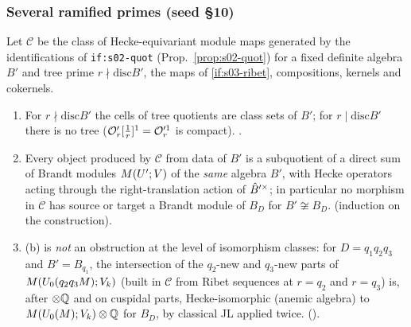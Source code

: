 \subsubsection{Several ramified primes (seed \S10)}\label{sss:s05-general}
\begin{proposition}\label{prop:s05-nochain}
Let $\mathcal C$ be the class of Hecke-equivariant module maps generated by the identifications of \texttt{if:s02-quot}
(Prop.~\ref{prop:s02-quot}) for a fixed definite algebra $B'$ and tree prime $r\nmid\mathrm{disc}B'$, the maps of \ref{if:s03-ribet},
compositions, kernels and cokernels.
\begin{enumerate}[label=(\alph*)]
\item For $r\nmid\mathrm{disc}B'$ the cells of tree quotients are class sets of $B'$; for $r\mid\mathrm{disc}B'$ there is no tree
  ($\mathcal{O}'_r[\frac1r]^1=\mathcal{O}'^1_r$ is compact). \stproved.
\item Every object produced by $\mathcal C$ from data of $B'$ is a subquotient of a direct sum of Brandt modules $M(U';V)$ of
  the \emph{same} algebra $B'$, with Hecke operators acting through the right-translation action of $\hat{B}'^\times$; in particular no
  morphism in $\mathcal C$ has source or target a Brandt module of $B_D$ for $B'\not\cong B_D$. \stproved{} (induction on the construction).
\item (b) is \emph{not} an obstruction at the level of isomorphism classes: for $D=q_1q_2q_3$ and $B'=B_{q_1}$, the intersection of the
  $q_2$-new and $q_3$-new parts of $M(U_0(q_2q_3M);V_k)$ (built in $\mathcal C$ from Ribet sequences at $r=q_2$ and $r=q_3$) is,
  after $\otimes\mathbb{Q}$ and on cuspidal parts, Hecke-isomorphic (anemic algebra) to $M(U_0(M);V_k)\otimes\mathbb{Q}$ for $B_D$, by classical JL
  applied twice. \stpmc{} ().
\end{enumerate}
\end{proposition}
